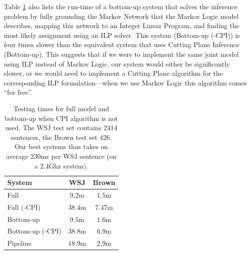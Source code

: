 Table \ref{tbl:nocpi} also lists the run-time of a bottom-up system that solves the inference problem by fully grounding the Markov Network that the Markov Logic model describes, mapping this network to an Integer Linear Program, and finding the most likely assignment using an ILP solver. This system (Bottom-up (-CPI)) is four times slower than the equivalent system that uses Cutting Plane Inference  (Bottom-up). This suggests that if we were to implement the same joint model using ILP instead of Markov Logic, our system would either be significantly slower, or we would need to implement a Cutting Plane algorithm for the corresponding ILP formulation---when we use Markov Logic this algorithm comes ``for free''. 


\begin{table}[ht]

    \centering
    \begin{tabular}{|p{3.0cm}|c|c|}\hline
        System                           & WSJ       & Brown   \\\hline 
        Full                             & $9.2$m    & $1.5$m  \\
        Full (-CPI)                      & $38.4$m   & $7.47$m  \\
        Bottom-up                        & $9.5$m    & $1.6$m  \\
        Bottom-up (-CPI)                 & $38.8$m   & $6.9$m  \\
        Pipeline                         & $18.9$m   & $2.9$m  \\\hline
    \end{tabular}
    \caption{Testing times for full model and bottom-up when CPI algorithm is
    not used. The WSJ test set contains 2414 sentences, the Brown test set 426. Our best systems thus takes on average 230ms per WSJ sentence (on a 2.4Ghz system). }
    \label{tbl:nocpi}
\end{table}


